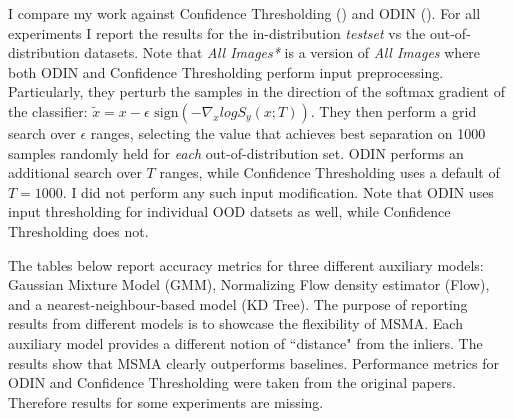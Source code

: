 I compare my work against Confidence Thresholding (\cite{Devries}) and ODIN (\cite{Liang2017}). For all experiments I report the results for the in-distribution \textit{testset} vs the out-of-distribution datasets. Note that \textit{All Images*} is a version of \textit{All Images} where both ODIN and Confidence Thresholding perform input preprocessing. Particularly, they perturb the samples in the direction of the softmax gradient of the classifier:
$\tilde{x} = x - \epsilon \text{ sign} (- \nabla_x log S_y(x;T))$.
They then perform a grid search over $\epsilon$ ranges, selecting the value that achieves best separation on 1000 samples randomly held for \textit{each} out-of-distribution set. ODIN performs an additional search over $T$ ranges, while Confidence Thresholding uses a default of $T=1000$. I did not perform any such input modification. Note that ODIN uses input thresholding for individual OOD datsets as well, while Confidence Thresholding does not. 

The tables below report accuracy metrics for three different
auxiliary models: Gaussian Mixture Model (GMM), Normalizing Flow density estimator (Flow),
and a nearest-neighbour-based model (KD Tree). The purpose of reporting results from different
models is to showcase the flexibility of MSMA. Each auxiliary model provides a different
notion of ``distance" from the inliers. The results show that MSMA clearly outperforms baselines. Performance metrics for ODIN and Confidence Thresholding were taken from the original papers. Therefore results for some experiments are missing. 



